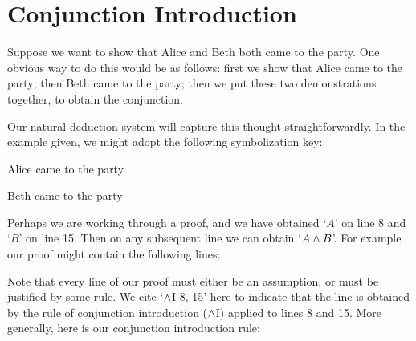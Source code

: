 



\section{Conjunction Introduction}
Suppose we want to show that Alice and Beth both came to the party. One obvious way to do this would be as follows: first we show that Alice came to the party; then Beth came to the party; then we put these two demonstrations together, to obtain the conjunction.

Our natural deduction system will capture this thought straightforwardly. In the example given, we might adopt the following symbolization key:
	\begin{ekey}
		\item[A] Alice came to the party
		\item[B] Beth came to the party
	\end{ekey}
Perhaps we are working through a proof, and we have obtained `$A$' on line 8 and `$B$' on line 15. Then on any subsequent line we can obtain `$A \mathbin{\wedge} B$'. For example our proof might contain the following lines:
\begin{fitchproof}
	\ellipsesline
	\hspace*{1em}
	\ellipsesline
	\hspace*{1em}
	\ellipsesline
	 \hspace*{1em}
\end{fitchproof}
Note that every line of our proof must either be an assumption, or must be justified by some rule. We cite `$\mathbin{\wedge}$I 8, 15' here to indicate that the line is obtained by the rule of conjunction introduction ($\mathbin{\wedge}$I) applied to lines 8 and 15.
More generally, here is our conjunction introduction rule:
\begin{highlighted}
\begin{fitchproof}
	\ellipsesline
		\ellipsesline
		\ellipsesline
	 
\end{fitchproof}
\end{highlighted}





